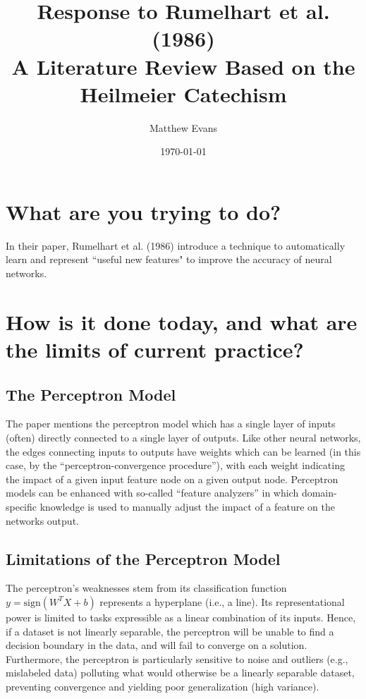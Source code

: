 \documentclass[10pt]{article}
\title{
    Response to Rumelhart et al. (1986) \\
    \large A Literature Review Based on the Heilmeier Catechism
}
\author{Matthew Evans}
\date{\today}
\begin{document}
\maketitle

\section*{What are you trying to do?}

In their paper, Rumelhart et al. (1986) introduce a technique to automatically learn and represent ``useful new features" to improve the accuracy of neural networks.



\section*{How is it done today, and what are the limits of current practice?}
\subsection*{The Perceptron Model}


The paper mentions the perceptron model which has a single layer of inputs (often) directly connected to a single layer of outputs. Like other neural networks, the edges connecting inputs to outputs have weights which can be learned (in this case, by the ``perceptron-convergence procedure''), with each weight indicating the impact of a given input feature node on a given output node. Perceptron models can be enhanced with so-called ``feature analyzers'' in which domain-specific knowledge is used to manually adjust the impact of a feature on the networks output.

\subsection*{Limitations of the Perceptron Model}

The perceptron's weaknesses stem from its classification function $y = \text{sign}(W^TX+b)$ represents a hyperplane (i.e., a line). Its representational power is limited to tasks expressible as a linear combination of its inputs. Hence, if a dataset is not linearly separable, the perceptron will be unable to find a decision boundary in the data, and will fail to converge on a solution. Furthermore, the perceptron is particularly sensitive to noise and outliers (e.g., mislabeled data) polluting what would otherwise be a linearly separable dataset, preventing convergence and yielding poor generalization (high variance).
\end{document}
